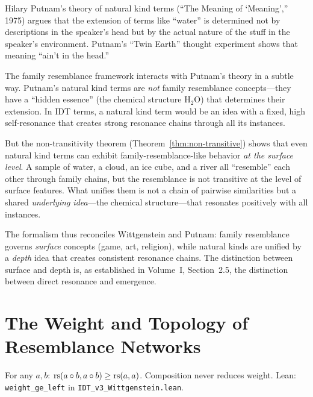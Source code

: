 \begin{interpretation}
Hilary Putnam's theory of natural kind terms (``The Meaning of `Meaning','' 1975)
argues that the extension of terms like ``water'' is determined not by
descriptions in the speaker's head but by the actual nature of the stuff in
the speaker's environment. Putnam's ``Twin Earth'' thought experiment shows
that meaning ``ain't in the head.''

The family resemblance framework interacts with Putnam's theory in a subtle way.
Putnam's natural kind terms are \emph{not} family resemblance concepts---they
have a ``hidden essence'' (the chemical structure H$_2$O) that determines their
extension. In IDT terms, a natural kind term would be an idea with a fixed,
high self-resonance that creates strong resonance chains through all its
instances.

But the non-transitivity theorem (Theorem~\ref{thm:non-transitive}) shows that
even natural kind terms can exhibit family-resemblance-like behavior \emph{at the
surface level}. A sample of water, a cloud, an ice cube, and a river all
``resemble'' each other through family chains, but the resemblance is not
transitive at the level of surface features. What unifies them is not a chain of
pairwise similarities but a shared \emph{underlying idea}---the chemical
structure---that resonates positively with all instances.

The formalism thus reconciles Wittgenstein and Putnam: family resemblance governs
\emph{surface} concepts (game, art, religion), while natural kinds are unified
by a \emph{depth} idea that creates consistent resonance chains. The distinction
between surface and depth is, as established in Volume~I, Section~2.5, the
distinction between direct resonance and emergence.
\end{interpretation}

\section{The Weight and Topology of Resemblance Networks}

\begin{theorem}
\label{thm:weight-monotone}
For any $a, b$: $\mathrm{rs}(a \circ b, a \circ b) \geq \mathrm{rs}(a, a)$.
Composition never reduces weight.
Lean: \texttt{weight\_ge\_left} in \texttt{IDT\_v3\_Wittgenstein.lean}.
\end{theorem}

